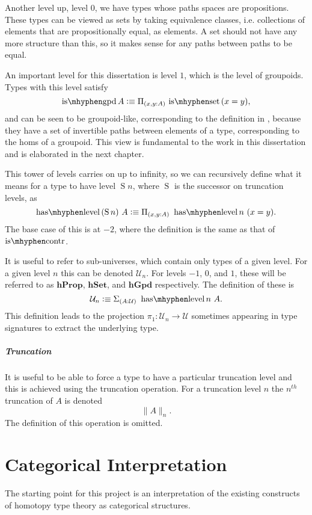 \documentclass[12pt, parskip, DIV=14]{scrbook}
\newcommand{\defeq}{\vcentcolon\equiv}
\newcommand{\iscontr}{\operatorname{is\mhyphen contr}}
\newcommand{\isset}{\operatorname{is\mhyphen set}}
\newcommand{\isgpd}{\operatorname{is\mhyphen gpd}}
\newcommand{\haslevel}{\operatorname{has\mhyphen level}}
\newcommand{\Suc}{\operatorname{S}}
\newcommand{\hProp}{\mathbf{hProp}}
\newcommand{\hSet}{\mathbf{hSet}}
\newcommand{\hGpd}{\mathbf{hGpd}}
\begin{document}
Another level up, level $0$, we have types whose paths spaces are propositions. These types can be viewed as sets by taking equivalence classes, i.e. collections of elements that are propositionally equal, as elements. A set should not have any more structure than this, so it makes sense for any paths between paths to be equal.

An important level for this dissertation is level $1$, which is the level of groupoids. Types with this level satisfy
$$\isgpd A \defeq \Pi_{(x , y : A)}\,\isset\,(x = y),$$
and can be seen to be groupoid-like, corresponding to the definition in , because they have a set of invertible paths between elements of a type, corresponding to the homs of a groupoid. This view is fundamental to the work in this dissertation and is elaborated in the next chapter.

This tower of levels carries on up to infinity, so we can recursively define what it means for a type to have level $\Suc n$, where $\Suc$ is the successor on truncation levels, as
$$\haslevel\,(\Suc n)~A \defeq \Pi_{(x , y : A)}~\haslevel n~(x = y).$$ The base case of this is at $-2$, where the definition is the same as that of $\iscontr$.

It is useful to refer to sub-universes, which contain only types of a given level. For a given level $n$ this can be denoted $\mathcal{U}_n$. For levels $-1$, $0$, and $1$, these will be referred to as $\hProp$, $\hSet$, and $\hGpd$ respectively. The definition of these is
$$\mathcal{U}_n \defeq \Sigma_{(A : \mathcal{U})}~\haslevel n~A.$$ This definition leads to the projection $\pi_1 : \mathcal{U}_n \to \mathcal{U}$ sometimes appearing in type signatures to extract the underlying type.

\paragraph{Truncation}

It is useful to be able to force a type to have a particular truncation level and this is achieved using the truncation operation. For a truncation level $n$ the $n^{th}$ truncation of $A$ is denoted
$$\| A \|_n.$$
The definition of this operation is omitted.

\chapter{Categorical Interpretation}
\label{chap:interp}

The starting point for this project is an interpretation of the existing constructs of homotopy type theory as categorical structures.
\end{document}
